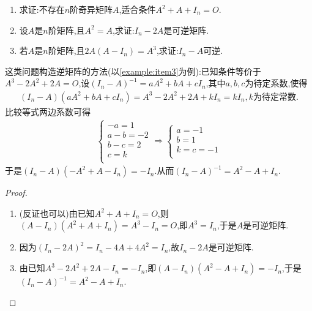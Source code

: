 \documentclass[../../main.tex]{subfiles}%
\begin{document}
\begin{example}
\begin{enumerate}
\item 求证:不存在\(n\)阶奇异矩阵\(A\),适合条件\(A^2 + A+I_n = O\).
\item 设\(A\)是\(n\)阶矩阵,且\(A^2 = A\),求证:\(I_n - 2A\)是可逆矩阵.
\item \label{example:item3}若\(A\)是\(n\)阶矩阵,且\(2A(A - I_n)=A^3\),求证:\(I_n - A\)可逆.
\end{enumerate}
\end{example}
\begin{note}
这类问题构造逆矩阵的方法(以\ref{example:item3}为例):已知条件等价于$A^3-2A^2+2A=O$,设$(I_n-A)^{-1}=aA^2+bA+cI_n$,其中$a,b,c$为待定系数,使得\begin{align*}
\left( I_n-A \right) \left( aA^2+bA+cI_n \right) =A^3-2A^2+2A+kI_n=kI_n,k\text{为待定常数}.
\end{align*}
比较等式两边系数可得
\begin{align*}
\begin{cases}
-a=1\\
a-b=-2\\
b-c=2\\
c=k\\
\end{cases}\Rightarrow \begin{cases}
a=-1\\
b=1\\
k=c=-1\\
\end{cases}
\end{align*}
于是$\left( I_n-A \right) \left( -A^2+A-I_n \right) =-I_n.$从而$\left( I_n-A \right) ^{-1}=A^2-A+I_n.$
\end{note}
\begin{proof}
\begin{enumerate}
\item (反证也可以)由已知\(A^2 + A+I_n = O\),则\((A - I_n)(A^2 + A+I_n)=A^3 - I_n = O\),即\(A^3 = I_n\),于是\(A\)是可逆矩阵.
\item 因为\((I_n - 2A)^2 = I_n - 4A + 4A^2 = I_n\),故\(I_n - 2A\)是可逆矩阵.
\item 由已知\(A^3 - 2A^2 + 2A - I_n=-I_n\),即\((A - I_n)(A^2 - A + I_n)=-I_n\),于是\((I_n - A)^{-1}=A^2 - A + I_n\).
\end{enumerate}
\end{proof}
\end{document}
